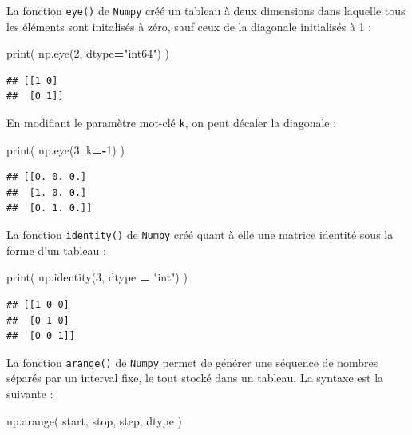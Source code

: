 \documentclass[
  12pt,
]{book}
\newenvironment{Shaded}{\begin{snugshade}}{\end{snugshade}}
\newcommand{\BuiltInTok}[1]{#1}
\newcommand{\DecValTok}[1]{\textcolor[rgb]{0.00,0.00,0.81}{#1}}
\newcommand{\NormalTok}[1]{#1}
\newcommand{\OperatorTok}[1]{\textcolor[rgb]{0.81,0.36,0.00}{\textbf{#1}}}
\newcommand{\StringTok}[1]{\textcolor[rgb]{0.31,0.60,0.02}{#1}}
\numberwithin{equation}{section}
\numberwithin{countremarque}{section}
\begin{document}
La fonction \texttt{eye()} de \texttt{Numpy} créé un tableau à deux dimensions dans laquelle tous les éléments sont initalisés à zéro, sauf ceux de la diagonale initialisés à 1 :

\begin{Shaded}
\begin{Highlighting}[]
\BuiltInTok{print}\NormalTok{( np.eye(}\DecValTok{2}\NormalTok{, dtype}\OperatorTok{=}\StringTok{"int64"}\NormalTok{) )}
\end{Highlighting}
\end{Shaded}

\begin{lstlisting}
## [[1 0]
##  [0 1]]
\end{lstlisting}

En modifiant le paramètre mot-clé \texttt{k}, on peut décaler la diagonale :

\begin{Shaded}
\begin{Highlighting}[]
\BuiltInTok{print}\NormalTok{( np.eye(}\DecValTok{3}\NormalTok{, k}\OperatorTok{={-}}\DecValTok{1}\NormalTok{) )}
\end{Highlighting}
\end{Shaded}

\begin{lstlisting}
## [[0. 0. 0.]
##  [1. 0. 0.]
##  [0. 1. 0.]]
\end{lstlisting}

La fonction \texttt{identity()} de \texttt{Numpy} créé quant à elle une matrice identité sous la forme d'un tableau :

\begin{Shaded}
\begin{Highlighting}[]
\BuiltInTok{print}\NormalTok{( np.identity(}\DecValTok{3}\NormalTok{, dtype }\OperatorTok{=} \StringTok{"int"}\NormalTok{) )}
\end{Highlighting}
\end{Shaded}

\begin{lstlisting}
## [[1 0 0]
##  [0 1 0]
##  [0 0 1]]
\end{lstlisting}

La fonction \texttt{arange()} de \texttt{Numpy} permet de générer une séquence de nombres séparés par un interval fixe, le tout stocké dans un tableau. La syntaxe est la suivante :

\begin{Shaded}
\begin{Highlighting}[]
\NormalTok{np.arange( start, stop, step, dtype )}
\end{Highlighting}
\end{Shaded}
\end{document}

